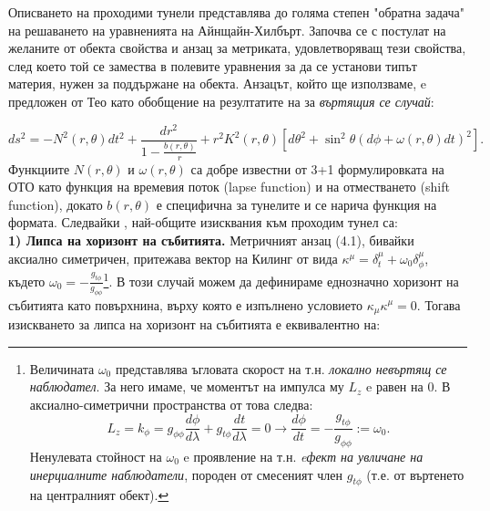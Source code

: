 Описването на проходими тунели представлява до голяма степен "обратна задача"$\,$ на решаването на уравненията на Айнщайн-Хилбърт. Започва се с постулат на желаните от обекта свойства и анзац за метриката, удовлетворяващ тези свойства, след което той се замества в полевите уравнения за да се установи типът материя, нужен за поддържане на обекта. Анзацът, който ще използваме, e предложен от Тео \cite{Teo} като обобщение на резултатите на \cite{Morris1988} за \emph{въртящия се случай}:
	
\begin{equation}
	ds^2 = -N^2(r,\theta)dt^2 + \frac{dr^2}{1 - \frac{b(r,\theta)}{r}} + r^2K^2(r,\theta)\left[d\theta^2 + \sin^2\theta\left(d\phi + \omega(r,\theta)dt\right)^2\right].
\end{equation}
Функциите $N(r,\theta)$ и $\omega(r,\theta)$ са добре известни от 3+1 формулировката на ОТО като функция на времевия поток (lapse function) и на отместването (shift function), докато $b(r,\theta)$ е специфична за тунелите и се нарича функция на формата. Следвайки \cite{Morris1988}, най-общите изисквания към проходим тунел са:\\

\noindent\textbf{1) Липса на хоризонт на събитията.} Метричният анзац (4.1), бивайки аксиално симетричен, притежава вектор на Килинг от вида $\kappa^\mu = \delta_t^\mu + \omega_0\delta^\mu_\phi$, където $\omega_0 = -\frac{g_{t\phi}}{g_{\phi\phi}}$\footnote{Величината $\omega_0$ представлява ъгловата скорост на т.н. \emph{локално невъртящ се наблюдател}. За него имаме, че моментът на импулса му $L_z$ e равен на 0. В аксиално-симетрични пространства от това следва:
	\begin{equation*}
		L_z = k_\phi = g_{\phi\phi}\frac{d\phi}{d\lambda} + g_{t\phi}\frac{dt}{d\lambda} = 0\rightarrow \frac{d\phi}{dt} = -\frac{g_{t\phi}}{g_{\phi\phi}} := \omega_0.
	\end{equation*}
	Ненулевата стойност на $\omega_0$ e проявление на т.н. \emph{eфект на увличане на инерциалните наблюдатели}, породен от смесеният член $g_{t\phi}$ (т.е. от въртенето на централният обект).}. В този случай можем да дефинираме еднозначно хоризонт на събитията като повърхнина, върху която е изпълнено условието $\kappa_\mu \kappa^\mu = 0$. Тогава изискването за липса на хоризонт на събитията е еквивалентно на:

